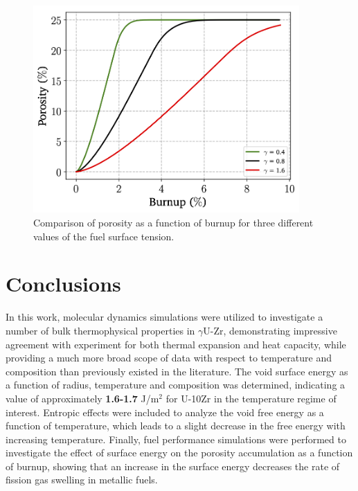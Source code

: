 \documentclass[review]{elsarticle}
\providecommand{\DIFaddtex}[1]{{\bf #1}} %
\providecommand{\DIFdeltex}[1]{} %
\providecommand{\DIFaddbegin}{\protect\color{blue}} %
\providecommand{\DIFaddend}{\protect\color{black}} %
\providecommand{\DIFdelbegin}{\protect\color{red}} %
\providecommand{\DIFdelend}{\protect\color{black}} %
\providecommand{\DIFaddbeginFL}{} %
\providecommand{\DIFaddendFL}{} %
\providecommand{\DIFdelbeginFL}{} %
\providecommand{\DIFdelendFL}{} %
\providecommand{\DIFadd}[1]{\texorpdfstring{\DIFaddtex{#1}}{#1}} %
\providecommand{\DIFdel}[1]{\texorpdfstring{\DIFdeltex{#1}}{}} %
\newcommand{\DIFscaledelfig}{0.5}
\newlength{\DIFdelgraphicswidth} %
\newlength{\DIFdelgraphicsheight} %
\newcommand{\DIFaddincludegraphics}[2][]{{\color{blue}\fbox{\DIFOincludegraphics[#1]{#2}}}} %
\newcommand{\DIFdelincludegraphics}[2][]{%
\sbox{\DIFdelgraphicsbox}{\DIFOincludegraphics[#1]{#2}}%
\settoboxwidth{\DIFdelgraphicswidth}{\DIFdelgraphicsbox} %
\settoboxtotalheight{\DIFdelgraphicsheight}{\DIFdelgraphicsbox} %
\scalebox{\DIFscaledelfig}{%
\parbox[b]{\DIFdelgraphicswidth}{\usebox{\DIFdelgraphicsbox}\\[-\baselineskip] \rule{\DIFdelgraphicswidth}{0em}}\llap{\resizebox{\DIFdelgraphicswidth}{\DIFdelgraphicsheight}{%
\setlength{\unitlength}{\DIFdelgraphicswidth}%
\begin{picture}(1,1)%
\thicklines\linethickness{2pt} %
{\color[rgb]{1,0,0}\put(0,0){\framebox(1,1){}}}%
{\color[rgb]{1,0,0}\put(0,0){\line( 1,1){1}}}%
{\color[rgb]{1,0,0}\put(0,1){\line(1,-1){1}}}%
\end{picture}%
}\hspace*{3pt}}} %
} %
\DeclareRobustCommand{\DIFaddbegin}{\DIFOaddbegin \let\includegraphics\DIFaddincludegraphics} %
\DeclareRobustCommand{\DIFaddend}{\DIFOaddend \let\includegraphics\DIFOincludegraphics} %
\DeclareRobustCommand{\DIFdelbegin}{\DIFOdelbegin \let\includegraphics\DIFdelincludegraphics} %
\DeclareRobustCommand{\DIFdelend}{\DIFOaddend \let\includegraphics\DIFOincludegraphics} %
\DeclareRobustCommand{\DIFaddbeginFL}{\DIFOaddbeginFL \let\includegraphics\DIFaddincludegraphics} %
\DeclareRobustCommand{\DIFaddendFL}{\DIFOaddendFL \let\includegraphics\DIFOincludegraphics} %
\DeclareRobustCommand{\DIFdelbeginFL}{\DIFOdelbeginFL \let\includegraphics\DIFdelincludegraphics} %
\DeclareRobustCommand{\DIFdelendFL}{\DIFOaddendFL \let\includegraphics\DIFOincludegraphics} %
\begin{document}
\begin{figure}[!htp]
\begin{center}
\DIFdelbeginFL %
\DIFdelendFL \DIFaddbeginFL \includegraphics[keepaspectratio, width=4.0in]{10_plot_porosity_var_gamma}
\DIFaddendFL \end{center}
\caption{Comparison of porosity as a function of burnup for three different values of the fuel surface tension.}
\label{fig:plot_porosity_var_gamma}
\end{figure}

\FloatBarrier

\section{Conclusions}

In this work, molecular dynamics simulations were utilized to investigate a number of bulk thermophysical properties in $\gamma$U-Zr, demonstrating impressive agreement with experiment for both thermal expansion and heat capacity, while providing a much more broad scope of data with respect to temperature and composition than previously existed in the literature. The void surface energy as a function of radius, temperature and composition was determined, indicating a value of approximately \DIFdelbegin \DIFdel{1.7 }\DIFdelend \DIFaddbegin \DIFadd{1.6-1.7 }\DIFaddend J/m$^2$ for U-10Zr in the temperature regime of interest. Entropic effects were included to analyze the void free energy as a function of temperature, which leads to a slight decrease in the free energy with increasing temperature. Finally, fuel performance simulations were performed to investigate the effect of surface energy on the porosity accumulation as a function of burnup, showing that an increase in the surface energy decreases the rate of fission gas swelling in metallic fuels. 
\end{document}
